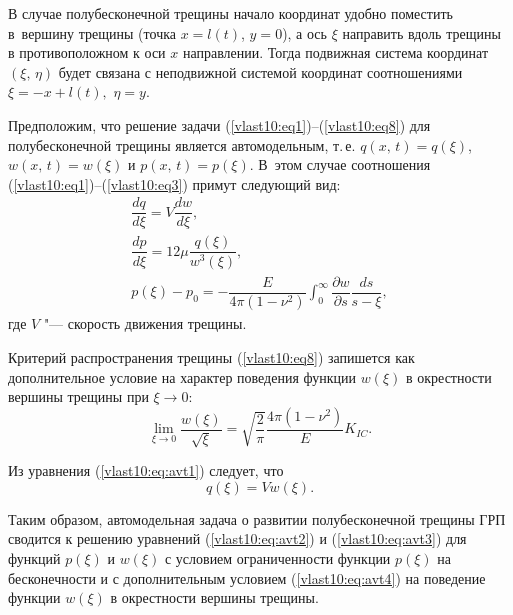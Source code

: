 В случае полубесконечной трещины начало координат удобно поместить в~вершину трещины
(точка $x=l (t)$, $y=0$),
а ось $\xi$ направить вдоль трещины в противоположном к оси $x$ направлении.
Тогда подвижная система координат $(\xi,\,\eta)$ будет связана с неподвижной системой координат
соотношениями $\xi=-x+l (t),$ $\eta=y$.

Предположим, что решение задачи (\ref{vlast10:eq1})--(\ref{vlast10:eq8}) для полубесконечной трещины является автомодельным,
т.\,е. $q (x,\, t) = q (\xi)$, $w (x,\, t) = w (\xi)$ и $p (x,\, t) = p(\xi)$.
В~этом случае соотношения (\ref{vlast10:eq1})--(\ref{vlast10:eq3}) примут следующий вид:
\begin{gather}
\dfrac{dq}{d\xi}=V\dfrac{dw}{d\xi},\label{vlast10:eq:avt1}\\
\dfrac{dp}{d\xi}=12\mu\dfrac{q (\xi)}{w^{3}(\xi)},\label{vlast10:eq:avt2}\\
p (\xi)-p_{0}=-\dfrac{E}{4\pi(1-\nu^{2})}\int_{0}^{\infty}\dfrac{\partial w}{\partial s}\dfrac{ds}{s-\xi},\label{vlast10:eq:avt3}
\end{gather}
где $V$ "--- скорость движения трещины.

Критерий распространения трещины (\ref{vlast10:eq8}) запишется как дополнительное условие
на характер поведения функции $w(\xi)$ в окрестности вершины трещины при $\xi\rightarrow 0$:
\begin{equation}
\lim_{\xi \rightarrow0}\frac{w (\xi)}{\sqrt{\xi}}=\sqrt{\frac{2}{\pi}}\frac{4\pi (1-\nu^{2})}{E} K_{IC}.\label{vlast10:eq:avt4}
\end{equation}

Из уравнения (\ref{vlast10:eq:avt1}) следует, что
\begin{equation}
q (\xi)=Vw (\xi).\label{vlast10:eq:avt5}
\end{equation}

Таким образом, автомодельная задача о развитии полубесконечной трещины ГРП сводится к решению уравнений
(\ref{vlast10:eq:avt2}) и  (\ref{vlast10:eq:avt3}) для функций $p (\xi)$ и $w (\xi )$ с условием
ограниченности функции $p (\xi )$   на бесконечности и с дополнительным условием (\ref{vlast10:eq:avt4})
на поведение функции $w (\xi)$ в окрестности вершины трещины.

